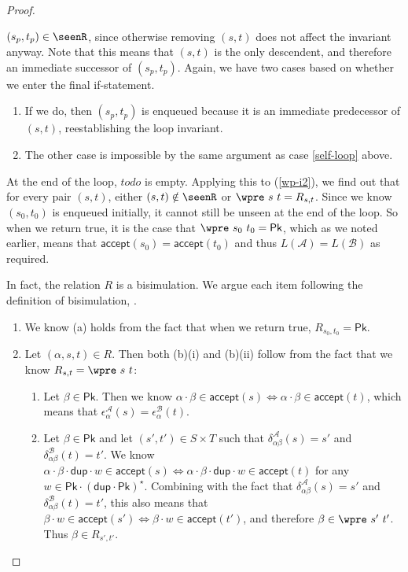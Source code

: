\documentclass[acmsmall,dvipsnames,nonacm]{acmart}
\newcommand\todoR{\textit{todo}}
\newcommand\true{\textcolor{codegreen}{true}}
\newcommand\Pk{\mathsf{Pk}}
\newcommand\pk{\alpha}
\newcommand\pkp{\beta}
\newcommand\dup{\mathsf{dup}}
\newcommand\ddd{\cdot\dup\cdot}
\newcommand\accept{\mathsf{accept}}
\newcommand\A{\mathcal{A}}
\newcommand\B{\mathcal{B}}
\newcommand\epsA{\epsilon^\A_\pk}
\newcommand\epsB{\epsilon^\B_\pk}
\newcommand\delA{\delta^\A_{\pk\pkp}}
\newcommand\delB{\delta^\B_{\pk\pkp}}
\begin{document}
\begin{proof}
\begin{itemize}
    $(s_p,t_p)\in\seenR$, since otherwise removing $(s,t)$ does not affect the
    invariant anyway. Note that this means that $(s,t)$ is the only descendent,
    and therefore an immediate successor of $(s_p,t_p)$. Again, we have two
    cases based on whether we enter the final if-statement.
    \begin{enumerate}
        \item If we do, then $(s_p, t_p)$ is enqueued because it is an immediate
        predecessor of $(s,t)$, reestablishing the loop invariant.
        \item The other case is impossible by the same argument as case
        \ref{self-loop} above.
    \end{enumerate}
\end{itemize}

At the end of the loop, $\todoR$ is empty. Applying this to (\ref{wp-i2}), we
find out that for every pair $(s,t)$, either $(s,t)\notin\seenR$ or $\wpre\ s\ t = R_{s,t}$.
Since we know $(s_0, t_0)$ is enqueued initially, it cannot still be unseen at
the end of the loop. So when we return \true, it is the case that $\wpre\ s_0\
t_0 = \Pk$, which as we noted earlier, means that $\accept(s_0) = \accept(t_0)$
and thus $L(\A) = L(\B)$ as required.

In fact, the relation $R$ is a bisimulation. We argue each item following the
definition of bisimulation, \Cref{def:bisim}.
\begin{enumerate}
    \item We know (a) holds from the fact that when we return true, $R_{s_0,t_0} = \Pk$.
    \item Let $(\pk, s, t)\in R$. Then both (b)(i) and (b)(ii) follow from the
    fact that we know $R_{s,t} = \wpre\ s\ t$:
        \begin{enumerate}
        \item Let $\pkp\in\Pk$. Then we know
        $\pk\cdot\pkp\in\accept(s)\Leftrightarrow\pk\cdot\pkp\in\accept(t)$,
        which means that $\epsA(s) = \epsB(t)$.
        \item Let $\pkp\in\Pk$ and let $(s',t')\in S\times T$ such that
        $\delA(s) = s'$ and $\delB(t) = t'$. We know
        $\pk\cdot\pkp\ddd w \in \accept(s) \Leftrightarrow\pk\cdot\pkp\ddd
        w\in\accept(t)$ for any $w\in \Pk\cdot(\dup\cdot\Pk)^\star$.
        Combining with the fact that $\delA(s) = s'$ and $\delB(t) = t'$, this
        also means that $\pkp\cdot w\in\accept(s') \Leftrightarrow \pkp\cdot
        w\in\accept(t')$, and therefore $\pkp\in \wpre\ s'\ t'$. Thus $\pkp\in R_{s',t'}$.
        \end{enumerate}
\end{enumerate}
\end{proof}
\end{document}
